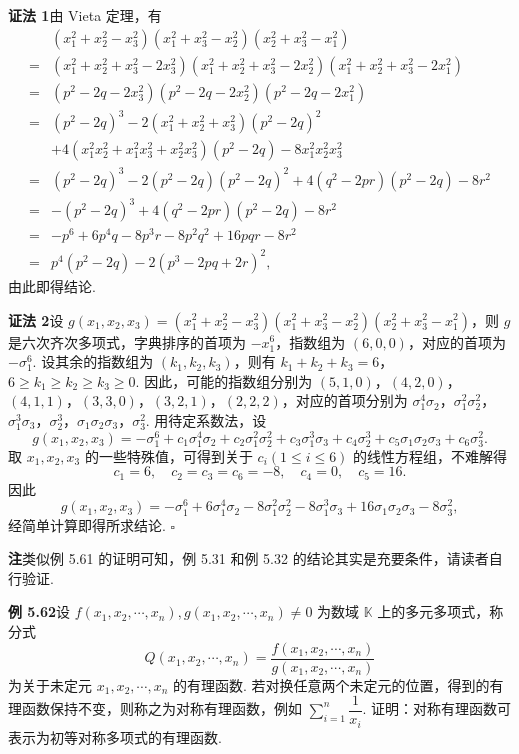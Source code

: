 \documentclass[UTF8,12pt,a4paper,fontset=fandol]{ctexart}
\begin{document}
\noindent\textbf{证法 1}\quad 由 Vieta 定理，有
\[
\begin{aligned}
&(x_1^2+x_2^2-x_3^2)(x_1^2+x_3^2-x_2^2)(x_2^2+x_3^2-x_1^2)\\
={}&(x_1^2+x_2^2+x_3^2-2x_3^2)(x_1^2+x_2^2+x_3^2-2x_2^2)(x_1^2+x_2^2+x_3^2-2x_1^2)\\
={}&(p^2-2q-2x_3^2)(p^2-2q-2x_2^2)(p^2-2q-2x_1^2)\\
={}&(p^2-2q)^3-2(x_1^2+x_2^2+x_3^2)(p^2-2q)^2\\
&+4(x_1^2x_2^2+x_1^2x_3^2+x_2^2x_3^2)(p^2-2q)-8x_1^2x_2^2x_3^2\\
={}&(p^2-2q)^3-2(p^2-2q)(p^2-2q)^2+4(q^2-2pr)(p^2-2q)-8r^2\\
={}&-(p^2-2q)^3+4(q^2-2pr)(p^2-2q)-8r^2\\
={}&-p^6+6p^4q-8p^3r-8p^2q^2+16pqr-8r^2\\
={}&p^4(p^2-2q)-2(p^3-2pq+2r)^2,
\end{aligned}
\]
由此即得结论.

\noindent\textbf{证法 2}\quad 设 $g(x_1,x_2,x_3)=(x_1^2+x_2^2-x_3^2)(x_1^2+x_3^2-x_2^2)(x_2^2+x_3^2-x_1^2)$，则 $g$ 是六次齐次多项式，字典排序的首项为 $-x_1^6$，指数组为 $(6,0,0)$，对应的首项为 $-\sigma_1^6$. 设其余的指数组为 $(k_1,k_2,k_3)$，则有 $k_1+k_2+k_3=6$，$6\ge k_1\ge k_2\ge k_3\ge0$. 因此，可能的指数组分别为 $(5,1,0)$，$(4,2,0)$，$(4,1,1)$，$(3,3,0)$，$(3,2,1)$，$(2,2,2)$，对应的首项分别为 $\sigma_1^4\sigma_2$，$\sigma_1^2\sigma_2^2$，$\sigma_1^3\sigma_3$，$\sigma_2^3$，$\sigma_1\sigma_2\sigma_3$，$\sigma_3^2$. 用待定系数法，设
\[
g(x_1,x_2,x_3)=-\sigma_1^6+c_1\sigma_1^4\sigma_2+c_2\sigma_1^2\sigma_2^2+c_3\sigma_1^3\sigma_3+c_4\sigma_2^3+c_5\sigma_1\sigma_2\sigma_3+c_6\sigma_3^2.
\]
取 $x_1,x_2,x_3$ 的一些特殊值，可得到关于 $c_i(1\le i\le6)$ 的线性方程组，不难解得
\[
c_1=6,\quad c_2=c_3=c_6=-8,\quad c_4=0,\quad c_5=16.
\]
因此
\[
g(x_1,x_2,x_3)=-\sigma_1^6+6\sigma_1^4\sigma_2-8\sigma_1^2\sigma_2^2-8\sigma_1^3\sigma_3+16\sigma_1\sigma_2\sigma_3-8\sigma_3^2,
\]
经简单计算即得所求结论. \hfill $\square$

\noindent\textbf{注}\quad 类似例 5.61 的证明可知，例 5.31 和例 5.32 的结论其实是充要条件，请读者自行验证.

\noindent\textbf{例 5.62}\quad 设 $f(x_1,x_2,\cdots,x_n),g(x_1,x_2,\cdots,x_n)\ne0$ 为数域 $\mathbb{K}$ 上的多元多项式，称分式
\[
Q(x_1,x_2,\cdots,x_n)=\frac{f(x_1,x_2,\cdots,x_n)}{g(x_1,x_2,\cdots,x_n)}
\]
为关于未定元 $x_1,x_2,\cdots,x_n$ 的有理函数. 若对换任意两个未定元的位置，得到的有理函数保持不变，则称之为对称有理函数，例如 $\sum_{i=1}^n\dfrac1{x_i}$. 证明：对称有理函数可表示为初等对称多项式的有理函数.
\end{document}
